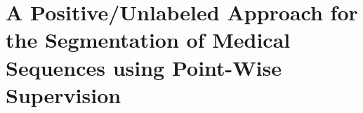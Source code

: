 \chapter{A Positive/Unlabeled Approach for the
Segmentation of Medical Sequences using
Point-Wise Supervision}



% 






